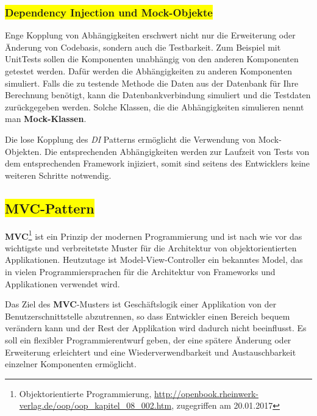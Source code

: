 \subsubsection{\colorbox{yellow}{Dependency Injection und Mock-Objekte}}\label{di}

Enge Kopplung von Abhängigkeiten erschwert nicht nur die Erweiterung oder Änderung von Codebasis, sondern auch die Testbarkeit. Zum Beispiel mit UnitTests sollen die Komponenten unabhängig von den anderen Komponenten getestet werden. Dafür werden die Abhängigkeiten zu anderen Komponenten simuliert. Falls die zu testende Methode die Daten aus der Datenbank für Ihre Berechnung benötigt, kann die Datenbankverbindung simuliert und die Testdaten zurückgegeben werden. Solche Klassen, die die Abhängigkeiten simulieren nennt man \textbf{Mock-Klassen}.

Die lose Kopplung des \textit{DI} Patterns ermöglicht die Verwendung von Mock-Objekten. Die entsprechenden Abhängigkeiten werden zur Laufzeit von Tests von dem entsprechenden Framework injiziert, somit sind seitens des Entwicklers keine weiteren Schritte notwendig.

\subsection{\colorbox{yellow}{MVC-Pattern}}\label{mvc}

\textbf{MVC}\footnote{Objektorientierte Programmierung, \url{http://openbook.rheinwerk-verlag.de/oop/oop_kapitel_08_002.htm}, zugegriffen am 20.01.2017} ist ein Prinzip der modernen Programmierung und ist nach wie vor das wichtigste und verbreitetste Muster für die Architektur von objektorientierten Applikationen. Heutzutage ist Model-View-Controller ein bekanntes Model, das in vielen Programmiersprachen für die Architektur von Frameworks und Applikationen verwendet wird.

Das Ziel des \textbf{MVC}-Musters ist Geschäftslogik einer Applikation von der Benutzerschnittstelle abzutrennen, so dass Entwickler einen Bereich bequem verändern kann und der Rest der Applikation wird dadurch nicht beeinflusst.
Es soll ein flexibler Programmierentwurf geben, der eine spätere Änderung oder Erweiterung erleichtert und eine Wiederverwendbarkeit und Austauschbarkeit einzelner Komponenten ermöglicht.

